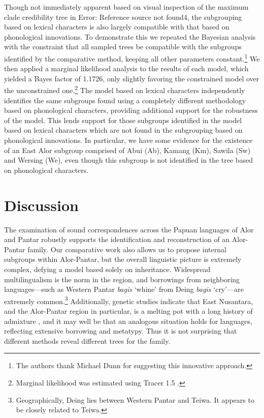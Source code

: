 Though not immediately apparent based on visual inspection of the maximum clade credibility tree in Error: Reference source not found4, the subgrouping based on lexical characters is also largely compatible with that based on phonological innovations. To demonstrate this we repeated the Bayesian analysis with the constraint that all sampled trees be compatible with the subgroups identified by the comparative method, keeping all other parameters constant.\footnote{ The authors thank Michael Dunn for suggesting this innovative approach. } We then applied a marginal likelihood analysis to the results of each model, which yielded a Bayes factor of 1.1726, only slightly favoring the constrained model over the unconstrained one.\footnote{ Marginal likelihood was estimated using Tracer 1.5 \citep{RambautEtAl2007}.} The model based on lexical characters independently identifies the same subgroups found using a completely different methodology
based on phonological characters, providing additional support for the robustness of the model. This lends support for those subgroups identified in the model based on lexical characters which are not found in the subgrouping based on phonological innovations. In particular, we have some evidence for the existence of an East Alor subgroup comprised of Abui (Ab), Kamang (Km), Sawila (Sw) and Wersing (We), even though this subgroup is not identified in the tree based on phonological characters.

\section{Discussion}
The examination of sound correspondences across the Papuan languages of Alor and Pantar robustly supports the identification and reconstruction of an Alor-Pantar family. Our comparative work also allows us to propose internal subgroups within Alor-Pantar, but the overall linguistic picture is extremely complex, defying a model based solely on inheritance. Widespread multilingualism is the norm in the region, and borrowings from neighboring languages---such as Western Pantar \textit{bagis }`whine' from Deing \textit{bagis }`cry'---are extremely common.\footnote{ Geographically, Deing lies between Western Pantar and Teiwa. It appears to be closely related to Teiwa. } Additionally, genetic studies indicate that East Nusantara, and the Alor-Pantar region in particular, is a melting pot with a long history of admixture \citep{MonaEtAl2009}, and it may well be that an analogous situation holds for languages, reflecting extensive borrowing and metatypy. Thus it is not surprising that
different methods reveal different trees for the family.


